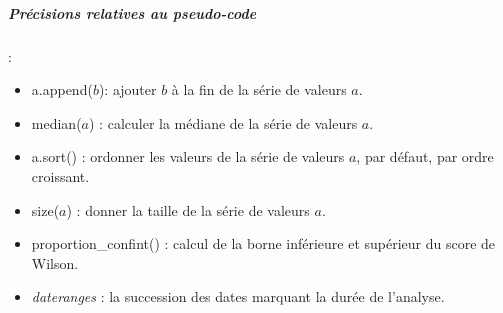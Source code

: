 \subparagraph{Précisions relatives au pseudo-code} : 

\begin{itemize}
	\item a.append($ b $): ajouter $ b $ à la fin de la série de valeurs  $ a $.
	
	\item median($ a $) : calculer la médiane de la série de valeurs  $ a $.
	
	\item a.sort() : ordonner les valeurs de la série de valeurs $ a $, par défaut, par ordre croissant.
	
	\item size($ a $) : donner la taille de la série de valeurs $a$.
	
	\item proportion\_confint() : calcul de la borne inférieure et supérieur du score de Wilson. 
	
	\item  \textit{dateranges}  : la succession des dates marquant la durée de l'analyse.
\end{itemize}



